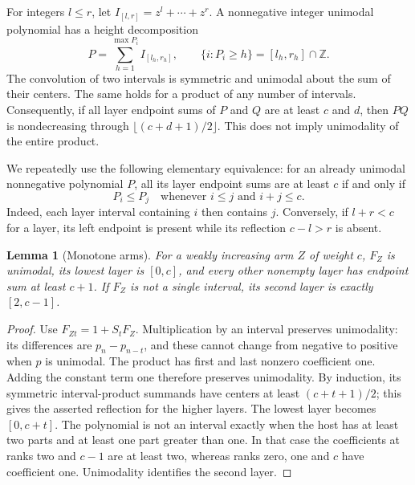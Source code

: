 \documentclass[11pt]{article}
\newtheorem{lemma}[theorem]{Lemma}
\theoremstyle{remark}\newtheorem{remark}[theorem]{Remark}
\newcommand{\Iv}[2]{I_{[#1,#2]}}
\begin{document}
For integers $l\le r$, let $\Iv l r=z^l+\cdots+z^r$. A nonnegative integer unimodal polynomial has a height decomposition
\[
 P=\sum_{h=1}^{\max P_i}\Iv{l_h}{r_h},\qquad
 \{i:P_i\ge h\}=[l_h,r_h]\cap\mathbb Z.
\]
The convolution of two intervals is symmetric and unimodal about the sum of their centers. The same holds for a product of any number of intervals. Consequently, if all layer endpoint sums of $P$ and $Q$ are at least $c$ and $d$, then $PQ$ is nondecreasing through $\lfloor(c+d+1)/2\rfloor$. This does not imply unimodality of the entire product.

We repeatedly use the following elementary equivalence: for an already unimodal nonnegative polynomial $P$, all its layer endpoint sums are at least $c$ if and only if
\begin{equation}\label{eq:comparison}
 P_i\le P_j\quad\text{whenever }i\le j\text{ and }i+j\le c.
\end{equation}
Indeed, each layer interval containing $i$ then contains $j$. Conversely, if $l+r<c$ for a layer, its left endpoint is present while its reflection $c-l>r$ is absent.

\begin{lemma}[Monotone arms]\label{lem:arms}
For a weakly increasing arm $Z$ of weight $c$, $F_Z$ is unimodal, its lowest layer is $[0,c]$, and every other nonempty layer has endpoint sum at least $c+1$. If $F_Z$ is not a single interval, its second layer is exactly $[2,c-1]$.
\end{lemma}
\begin{proof}
Use $F_{Zt}=1+S_tF_Z$. Multiplication by an interval preserves unimodality: its differences are $p_n-p_{n-t}$, and these cannot change from negative to positive when $p$ is unimodal. The product has first and last nonzero coefficient one. Adding the constant term one therefore preserves unimodality. By induction, its symmetric interval-product summands have centers at least $(c+t+1)/2$; this gives the asserted reflection for the higher layers. The lowest layer becomes $[0,c+t]$. The polynomial is not an interval exactly when the host has at least two parts and at least one part greater than one. In that case the coefficients at ranks two and $c-1$ are at least two, whereas ranks zero, one and $c$ have coefficient one. Unimodality identifies the second layer.
\end{proof}
\end{document}

